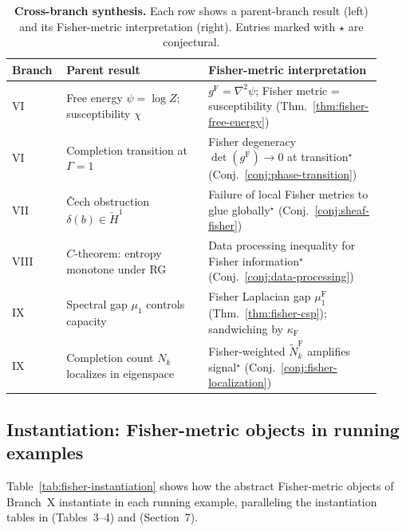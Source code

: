 \documentclass[11pt]{article}
\newcommand{\gF}{g^{\mathrm{F}}}
\theoremstyle{remark}
\begin{document}
\begin{table}[htbp]
\centering
\caption{\textbf{Cross-branch synthesis.}  Each row shows a parent-branch
result (left) and its Fisher-metric interpretation (right).  Entries marked
with $\star$ are conjectural.}
\label{tab:cross-branch}
\begin{tabularx}{\linewidth}{@{}p{0.12\linewidth}p{0.36\linewidth}p{0.44\linewidth}@{}}
\toprule
\textbf{Branch} & \textbf{Parent result} & \textbf{Fisher-metric interpretation} \\
\midrule
VI &
Free energy $\psi = \log Z$; susceptibility $\chi$ &
$\gF = \nabla^2\psi$; Fisher metric = susceptibility (Thm.~\ref{thm:fisher-free-energy}) \\
\addlinespace[2pt]
VI &
Completion transition at $\Gamma = 1$ &
Fisher degeneracy $\det(\gF) \to 0$ at transition$^\star$ (Conj.~\ref{conj:phase-transition}) \\
\addlinespace[2pt]
VII &
\v{C}ech obstruction $\delta(b) \in \check{H}^1$ &
Failure of local Fisher metrics to glue globally$^\star$ (Conj.~\ref{conj:sheaf-fisher}) \\
\addlinespace[2pt]
VIII &
$C$-theorem: entropy monotone under RG &
Data processing inequality for Fisher information$^\star$ (Conj.~\ref{conj:data-processing}) \\
\addlinespace[2pt]
IX &
Spectral gap $\mu_1$ controls capacity &
Fisher Laplacian gap $\mu_1^{\mathrm{F}}$ (Thm.~\ref{thm:fisher-csp}); sandwiching by $\kappa_{\mathrm{F}}$ \\
\addlinespace[2pt]
IX &
Completion count $N_k$ localizes in eigenspace &
Fisher-weighted $\tilde{N}_k^{\mathrm{F}}$ amplifies signal$^\star$ (Conj.~\ref{conj:fisher-localization}) \\
\bottomrule
\end{tabularx}
\end{table}

\subsection{Instantiation: Fisher-metric objects in running examples}

Table~\ref{tab:fisher-instantiation} shows how the abstract Fisher-metric
objects of Branch~X instantiate in each running example, paralleling the
instantiation tables in \cite{davis2025manifold} (Tables~3--4) and
\cite{davis2025sameness} (Section~7).
\end{document}
